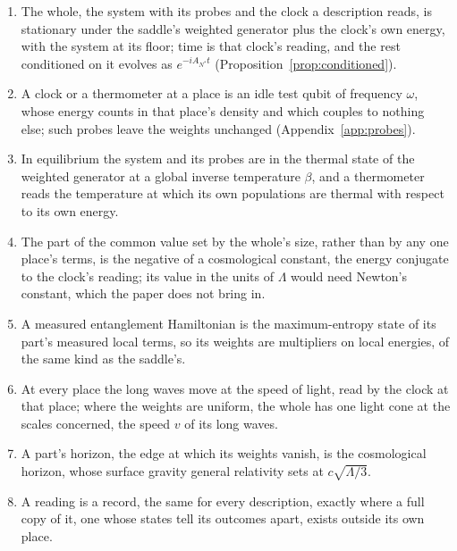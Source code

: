 \begin{enumerate}
  \item\label{premise:evolution} The whole, the system with its probes and the clock a description reads, is stationary under the saddle's weighted generator plus the clock's own energy, with the system at its floor; time is that clock's reading, and the rest conditioned on it evolves as $e^{-iA_{N^*}t}$ (Proposition~\ref{prop:conditioned}).
  \item\label{premise:probes} A clock or a thermometer at a place is an idle test qubit of frequency $\omega$, whose energy counts in that place's density and which couples to nothing else; such probes leave the weights unchanged (Appendix~\ref{app:probes}).
  \item\label{premise:equilibrium} In equilibrium the system and its probes are in the thermal state of the weighted generator at a global inverse temperature $\beta$, and a thermometer reads the temperature at which its own populations are thermal with respect to its own energy.
  \item\label{premise:constant} The part of the common value set by the whole's size, rather than by any one place's terms, is the negative of a cosmological constant, the energy conjugate to the clock's reading; its value in the units of $\Lambda$ would need Newton's constant, which the paper does not bring in.
  \item\label{premise:subsystem} A measured entanglement Hamiltonian is the maximum-entropy state of its part's measured local terms, so its weights are multipliers on local energies, of the same kind as the saddle's.
  \item\label{premise:cone} At every place the long waves move at the speed of light, read by the clock at that place; where the weights are uniform, the whole has one light cone at the scales concerned, the speed $v$ of its long waves.
  \item\label{premise:patch} A part's horizon, the edge at which its weights vanish, is the cosmological horizon, whose surface gravity general relativity sets at $c\sqrt{\Lambda/3}$.
  \item\label{premise:records} A reading is a record, the same for every description, exactly where a full copy of it, one whose states tell its outcomes apart, exists outside its own place.
\end{enumerate}
